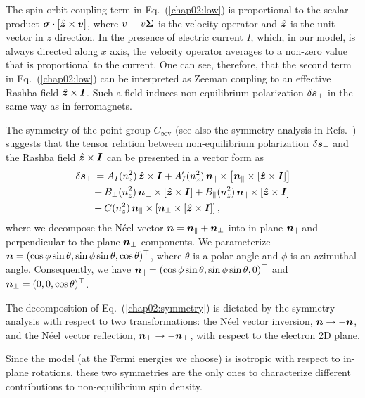The spin-orbit coupling term in Eq.~(\ref{chap02:low}) is proportional to the scalar product $\boldsymbol{\sigma}\cdot \left[\hat{\boldsymbol{z}}\times \boldsymbol{v}\right]$, where $\boldsymbol{v}=v\boldsymbol{\Sigma}$ is the velocity operator and $\hat{\boldsymbol{z}}$ is the unit vector in $z$ direction. In the presence of electric current $I$, which, in our model, is always directed along $x$ axis, the velocity operator averages to a non-zero value that is proportional to the current. One can see, therefore, that the second term in Eq.~(\ref{chap02:low}) can be interpreted as Zeeman coupling to an effective Rashba field $\hat{\boldsymbol{z}}\times \boldsymbol{I}$. Such a field induces non-equilibrium polarization $\delta\boldsymbol{s}_+$ in the same way as in ferromagnets. 

The symmetry of the point group $C_{\infty\textrm{v}}$ (see also the symmetry analysis in Refs.~\cite{vanderBijl2012, garello_symmetry_2013}) suggests that the tensor relation between non-equilibrium polarization $\delta\boldsymbol{s}_+$ and the Rashba field $\hat{\boldsymbol{z}}\times \boldsymbol{I}$ can be presented in a vector form as 
\begin{align}
\delta\boldsymbol{s}_+&\,= A_I(n_z^2)\,\hat{\boldsymbol{z}}\times \boldsymbol{I} + A'_I(n_z^2)\,\boldsymbol{n}_\parallel\times \left[\boldsymbol{n}_\parallel\times \left[\hat{\boldsymbol{z}}\times \boldsymbol{I}\right]\right]\nonumber\\
&+ B_\perp(n_z^2)\,\boldsymbol{n}_\perp\times \left[\hat{\boldsymbol{z}}\times \boldsymbol{I}\right]+B_\parallel(n_z^2)\,\boldsymbol{n}_\parallel\times \left[\hat{\boldsymbol{z}}\times \boldsymbol{I}\right]\nonumber\\
&+ C(n_z^2)\,\boldsymbol{n}_\parallel\times \left[\boldsymbol{n}_\perp\times \left[\hat{\boldsymbol{z}}\times \boldsymbol{I}\right]\right],
\label{chap02:symmetry}
\end{align}
where we decompose the N\'eel vector $\boldsymbol{n}=\boldsymbol{n}_\parallel+\boldsymbol{n}_\perp$ into in-plane $\boldsymbol{n}_\parallel$ and perpendicular-to-the-plane $\boldsymbol{n}_\perp$ components. We parameterize $\boldsymbol{n}=(\cos\phi\sin\theta, \sin\phi\sin\theta, \cos\theta)^\top$, where $\theta$ is a polar angle and $\phi$ is an azimuthal angle. Consequently, we have $\boldsymbol{n}_\parallel=(\cos\phi\sin\theta,\sin\phi\sin\theta,0)^\top$ and $\boldsymbol{n}_\perp=(0,0,\cos\theta)^\top$.

The decomposition of Eq.~(\ref{chap02:symmetry}) is dictated by the symmetry analysis with respect to two transformations: the N\'eel vector inversion, $\boldsymbol{n}\to -\boldsymbol{n}$, and the N\'eel vector reflection, $\boldsymbol{n}_\perp\to -\boldsymbol{n}_\perp$, with respect to the electron 2D plane. 

Since the model (at the Fermi energies we choose) is isotropic with respect to in-plane rotations, these two symmetries are the only ones to characterize different contributions to non-equilibrium spin density. 

